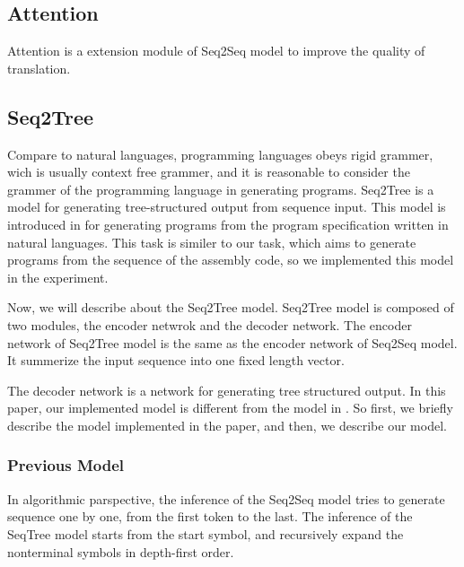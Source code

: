 \documentclass[senior,final,11pt]{iscs-thesis}
\begin{document}






\subsection{Attention}
Attention is a extension module of Seq2Seq model to improve the quality of translation. 



\subsection{Seq2Tree}
Compare to natural languages, programming languages obeys rigid grammer, wich is usually context free grammer,  
and it is reasonable to consider the grammer of the programming language in generating programs.
Seq2Tree is a model for generating tree-structured output from sequence input. This model is introduced in \cite{Seq2Tree} for generating programs from the program specification written in natural languages. 
This task is similer to our task, which aims to generate programs from the sequence of the assembly code, so we implemented this model in the experiment.

Now, we will describe about the Seq2Tree model.
Seq2Tree model is composed of two modules, the encoder netwrok and the decoder network.
The encoder network of Seq2Tree model is the same as the encoder network of Seq2Seq model. It summerize the input sequence into one fixed length vector.

The decoder network is a network for generating tree structured output. 
In this paper, our implemented model is different from the model in \cite{Seq2Tree}. 
So first, we briefly describe the model implemented in the paper, and then, we describe our model.

\subsubsection{Previous Model}
In algorithmic parspective, the inference of the Seq2Seq model tries to generate sequence one by one, from the first token to the last.
The inference of the SeqTree model starts from the start symbol, and recursively expand the nonterminal symbols in depth-first order.
\end{document}
